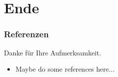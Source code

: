 \section{Ende}



\begin{frame}
 \frametitle{Referenzen}
  


\centering Danke für Ihre Aufmerksamkeit.


\begin{itemize}
  \item Maybe do some references here...
\end{itemize}



  
\end{frame}

